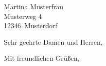 \documentclass[12pt,ngerman,max]{scrlttr2}
\begin{document}
 

\begin{letter}{Martina Musterfrau \\ Musterweg 4 \\ 12346~Musterdorf}
\opening{Sehr geehrte Damen und Herren,}
 
\blindtext[1]

\closing{Mit freundlichen Grüßen,}
\end{letter}
 
\end{document}
